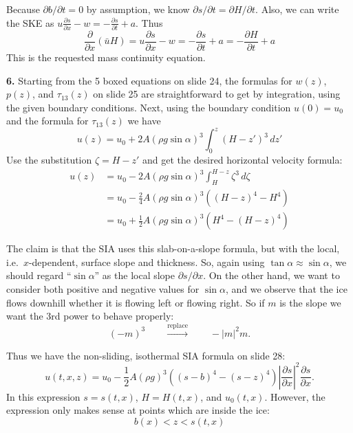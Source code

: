 \documentclass[12pt]{amsart}
\newcommand{\prob}[1]{\bigskip\noindent\textbf{#1.}\quad }
\begin{document}
Because $\partial b/\partial t=0$ by assumption, we know $\partial s/\partial t = \partial H/\partial t$.  Also, we can write the SKE as $u \frac{\partial s}{\partial x} - w = -\frac{\partial s}{\partial t} + a$.  Thus
	$$\frac{\partial}{\partial x}(\bar u H) = u \frac{\partial s}{\partial x} - w = -\frac{\partial s}{\partial t} + a = -\frac{\partial H}{\partial t} + a$$
This is the requested mass continuity equation.


\prob{6}  Starting from the 5 boxed equations on slide 24, the formulas for $w(z)$, $p(z)$, and $\tau_{13}(z)$ on slide 25 are straightforward to get by integration, using the given boundary conditions.  Next, using the boundary condition $u(0)=u_0$ and the formula for $\tau_{13}(z)$ we have
    $$u(z) = u_0 + 2 A (\rho g \sin\alpha)^3 \int_0^z (H-z')^3\,dz'$$
Use the substitution $\zeta = H-z'$ and get the desired horizontal velocity formula:
\begin{align*}
u(z) &= u_0 - 2 A (\rho g \sin\alpha)^3 \int_H^{H-z} \zeta^3\,d\zeta \\
     &= u_0 - \frac{2}{4} A (\rho g \sin\alpha)^3  \left((H-z)^4 - H^4\right) \\
     &= u_0 + \frac{1}{2} A (\rho g \sin\alpha)^3  \left(H^4 - (H-z)^4\right)
\end{align*}

The claim is that the SIA uses this slab-on-a-slope formula, but with the local, i.e.~$x$-dependent, surface slope and thickness.  So, again using $\tan\alpha \approx \sin\alpha$, we should regard ``$\sin\alpha$'' as the local slope $\partial s/\partial x$.  On the other hand, we want to consider both positive and negative values for $\sin\alpha$, and we observe that the ice flows downhill whether it is flowing left or flowing right.  So if $m$ is the slope we want the 3rd power to behave properly:
	$$(-m)^3 \qquad \stackrel{\text{replace}}{\to} \qquad -|m|^2 m.$$

Thus we have the non-sliding, isothermal SIA formula on slide 28:
    $$u(t,x,z) = u_0 - \frac{1}{2} A (\rho g)^3 \left((s-b)^4 - (s-z)^4\right) \left|\frac{\partial s}{\partial x}\right|^2 \frac{\partial s}{\partial x}.$$
In this expression $s=s(t,x)$, $H=H(t,x)$, and $u_0(t,x)$.  However, the expression only makes sense at points which are inside the ice:
	$$b(x) < z < s(t,x)$$
\end{document}
